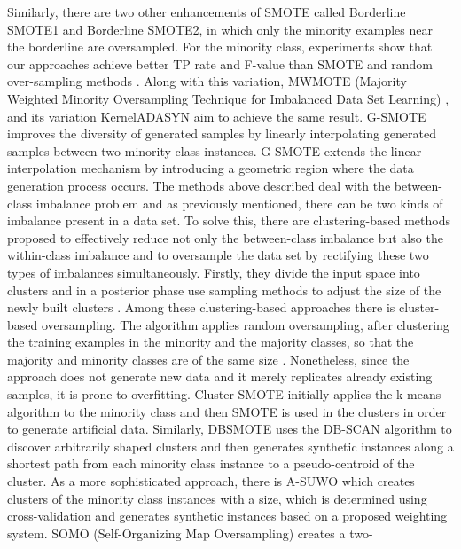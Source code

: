 \documentclass[parskip=full]{scrartcl}
\begin{document}
Similarly, there are two other enhancements of SMOTE called Borderline SMOTE1 
and Borderline SMOTE2, in which only the minority examples near the borderline 
are oversampled. For the minority class, experiments show that our approaches 
achieve better TP rate and F-value than SMOTE and random over-sampling methods 
\cite{Han2005}. Along with this variation, MWMOTE (Majority Weighted Minority 
Oversampling Technique for Imbalanced Data Set Learning) \cite{Barua2014}, and 
its variation KernelADASYN \cite{Tang2015} aim to achieve the same result. 
G-SMOTE \cite{Douzas2019} improves the diversity of generated samples by 
linearly interpolating generated samples between two minority class instances. 
G-SMOTE extends the linear interpolation mechanism by introducing a geometric 
region where the data generation process occurs. The methods above described 
deal with the between-class imbalance problem and as previously mentioned, 
there can be two kinds of imbalance present in a data set. To solve this, there 
are clustering-based methods proposed to effectively reduce not only the 
between-class imbalance but also the within-class imbalance and to oversample 
the data set by rectifying these two types of imbalances simultaneously. 
Firstly, they divide the input space into clusters and in a posterior phase use 
sampling methods to adjust the size of the newly built clusters 
\cite{Douzas2017a} \cite{Jo2004}. Among these clustering-based approaches there 
is cluster-based oversampling. The algorithm applies random oversampling, 
after clustering the training examples in the minority and the majority 
classes, so that the majority and minority classes are of the same size 
\cite{Jo2004}. Nonetheless, since the approach does not generate new data and 
it merely replicates already existing samples, it is prone to overfitting. 
Cluster-SMOTE \cite{Cieslak2006} initially applies the k-means algorithm to the 
minority class and then SMOTE is used in the clusters in order to generate 
artificial data. Similarly, DBSMOTE \cite{Bunkhumpornpat2012} uses the DB-SCAN 
algorithm to discover arbitrarily shaped clusters and then generates synthetic 
instances along a shortest path from each minority class instance to a 
pseudo-centroid of the cluster. As a more sophisticated approach, there is 
A-SUWO \cite{Nekooeimehr2016} which creates clusters of the minority class 
instances with a size, which is determined using cross-validation and generates 
synthetic instances based on a proposed weighting system.
SOMO (Self-Organizing Map Oversampling) \cite{Douzas2017a} creates a two- 
\end{document}
